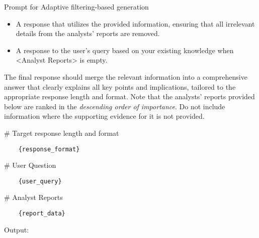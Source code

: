 \begin{figure*}[t]
\begin{AIbox}{Prompt for Adaptive filtering-based generation}
{\begin{itemize}
    \item A response that utilizes the provided information, ensuring that all irrelevant details from the analysts' reports are removed.
    \item A response to the user's query based on your existing knowledge when <Analyst Reports> is empty.
\end{itemize}

The final response should merge the relevant information into a comprehensive answer that clearly explains all key points and implications, tailored to the appropriate response length and format.
Note that the analysts' reports provided below are ranked in the {\it descending order of importance}. Do not include information where the supporting evidence for it is not provided.

\# Target response length and format 

\begin{verbatim}
    {response_format}
\end{verbatim}

\# User Question 

\begin{verbatim}
    {user_query}
\end{verbatim}

\# Analyst Reports 

\begin{verbatim}
    {report_data}
\end{verbatim}

Output:
}

\end{AIbox} 
\caption{The prompt for adaptive filtering-based generation.}
\label{fig:prompt_afg}
\end{figure*}





